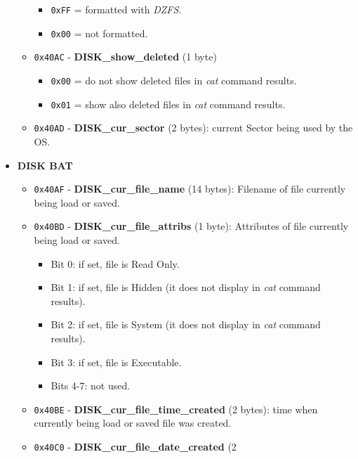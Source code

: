 \begin{itemize}
\begin{itemize}
\begin{itemize}
                    \item \texttt{0xFF} = formatted with \textit{DZFS}.
                    \item \texttt{0x00} = not formatted.
                \end{itemize}
                \item \texttt{0x40AC} - \textbf{DISK\_show\_deleted} (1 byte)
                \begin{itemize}
                    \item \texttt{0x00} = do not show deleted files in \textit{cat}
                    command results.
                    \item \texttt{0x01} = show also deleted files in \textit{cat}
                    command results.
                \end{itemize}
                \item \texttt{0x40AD} - \textbf{DISK\_cur\_sector} (2 bytes): current
                Sector being used by the OS.
            \end{itemize}
            \item \textbf{DISK BAT}
            \begin{itemize}
                \item \texttt{0x40AF} - \textbf{DISK\_cur\_file\_name} (14 bytes): 
                Filename of file currently being load or saved.
                \item \texttt{0x40BD} - \textbf{DISK\_cur\_file\_attribs} (1 byte):
                Attributes of file currently being load or saved.
                \begin{itemize}
                    \item Bit 0: if set, file is Read Only.
                    \item Bit 1: if set, file is Hidden (it does not display in
                    \textit{cat} command results).
                    \item Bit 2: if set, file is System (it does not display in
                    \textit{cat} command results).
                    \item Bit 3: if set, file is Executable.
                    \item Bits 4-7: not used.
                \end{itemize}
                \item \texttt{0x40BE} - \textbf{DISK\_cur\_file\_time\_created} (2
                bytes): time when currently being load or saved file was created.
                \item \texttt{0x40C0} - \textbf{DISK\_cur\_file\_date\_created} (2

\end{itemize}
\end{itemize}
